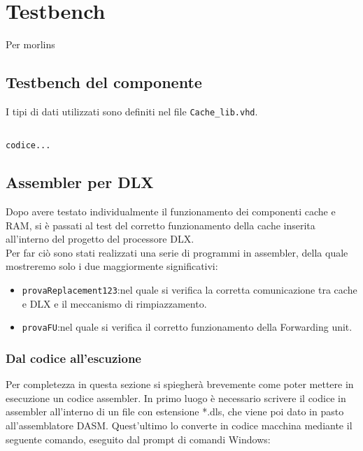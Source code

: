 \clearpage{\pagestyle{empty}\cleardoublepage}

\chapter{Testbench}

Per morlins

\section{Testbench del componente}

I tipi di dati utilizzati sono definiti nel file \texttt{Cache\_lib.vhd}.


\begin{lstlisting}

codice...

\end{lstlisting}


\section{Assembler per DLX}

Dopo avere testato individualmente il funzionamento dei componenti cache e RAM, si \`e passati al test del corretto funzionamento della cache inserita all'interno del progetto del processore DLX.\\
Per far ci\`o sono stati realizzati una serie di programmi in assembler, della quale mostreremo solo i due maggiormente significativi:
\begin{itemize}
 \item \texttt{provaReplacement123}:nel quale si verifica la corretta comunicazione tra cache e DLX e il meccanismo di rimpiazzamento.
 \item \texttt{provaFU}:nel quale si verifica il corretto funzionamento della Forwarding unit. 
\end{itemize}

\subsection{Dal codice all'escuzione}
Per completezza in questa sezione si spiegher\`a brevemente come poter mettere in esecuzione un codice assembler.
In primo luogo \`e necessario scrivere il codice in assembler all'interno di un file con estensione *.dls, che viene poi dato in pasto all'assemblatore DASM. Quest'ultimo lo converte in codice macchina mediante il seguente comando, eseguito dal prompt di comandi Windows:\\


